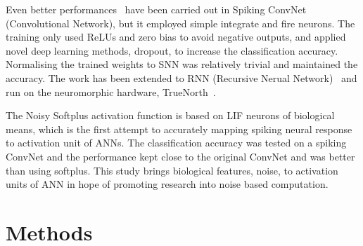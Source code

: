 \documentclass[runningheads,a4paper]{llncs}
\begin{document}
Even better performances~\cite{cao2015spiking,diehl2015fast} have been carried out in Spiking ConvNet (Convolutional Network), but it employed simple integrate and fire neurons.
The training only used ReLUs and zero bias to avoid negative outputs, and applied novel deep learning methods, dropout, to increase the classification accuracy.
Normalising the trained weights to SNN was relatively trivial and maintained the accuracy.
The work has been extended to RNN (Recursive Nerual Network)~\cite{diehl2016conversion} and run on the neuromorphic hardware, TrueNorth~\cite{merolla2014million}.
 
The Noisy Softplus activation function is based on LIF neurons of biological means, which is the first attempt to accurately mapping spiking neural response to activation unit of ANNs.
The classification accuracy was tested on a spiking ConvNet and the performance kept close to the original ConvNet and was better than using softplus.
This study brings biological features, noise, to activation units of ANN in hope of promoting research into noise based computation.
\section{Methods}
\end{document}

